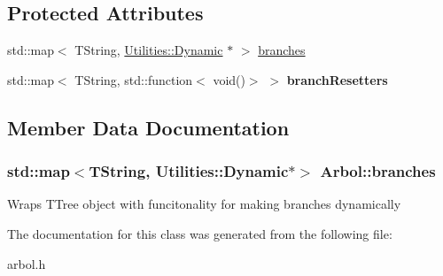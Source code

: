\subsection*{Protected Attributes}
\begin{DoxyCompactItemize}
\item 
std\+::map$<$ T\+String, \hyperlink{classUtilities_1_1Dynamic}{Utilities\+::\+Dynamic} $\ast$ $>$ \hyperlink{classArbol_aa5e8b636ab0e2df59aada12961beb738}{branches}
\item 
std\+::map$<$ T\+String, std\+::function$<$ void()$>$ $>$ {\bfseries branch\+Resetters}\hypertarget{classArbol_a7bbd718f5a514e8d073721913d5a982b}{}\label{classArbol_a7bbd718f5a514e8d073721913d5a982b}

\end{DoxyCompactItemize}


\subsection{Member Data Documentation}
\subsubsection[{\texorpdfstring{branches}{branches}}]{\setlength{\rightskip}{0pt plus 5cm}std\+::map$<$T\+String, {\bf Utilities\+::\+Dynamic}$\ast$$>$ Arbol\+::branches\hspace{0.3cm}{\ttfamily [protected]}}\hypertarget{classArbol_aa5e8b636ab0e2df59aada12961beb738}{}\label{classArbol_aa5e8b636ab0e2df59aada12961beb738}
Wraps T\+Tree object with funcitonality for making branches dynamically 

The documentation for this class was generated from the following file\+:\begin{DoxyCompactItemize}
\item 
arbol.\+h\end{DoxyCompactItemize}
